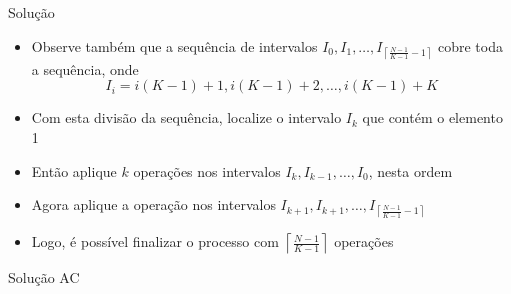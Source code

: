 \begin{frame}[fragile]{Solução}

    \begin{itemize}
        \item Observe também que a sequência de intervalos $I_0, I_1, \ldots, I_{\left\lceil \frac{N - 1}{K - 1} - 1\right\rceil}$ cobre toda a sequência, onde
        \[
            I_i = i(K - 1) + 1, i(K - 1) + 2, \ldots, i(K - 1) + K
        \]

        \item Com esta divisão da sequência, localize o intervalo $I_k$ que contém o elemento 1

        \item Então aplique $k$ operações nos intervalos $I_k, I_{k - 1}, \ldots, I_0$, nesta
            ordem

        \item Agora aplique a operação nos intervalos $I_{k + 1}, I_{k + 1}, \ldots, 
            I_{\left\lceil \frac{N - 1}{K - 1} - 1\right\rceil}$

        \item Logo, é possível finalizar o processo com  $\left\lceil \frac{N - 1}{K - 1} \right\rceil$
            operações
    \end{itemize}

\end{frame}

\begin{frame}[fragile]{Solução AC}
\end{frame}
